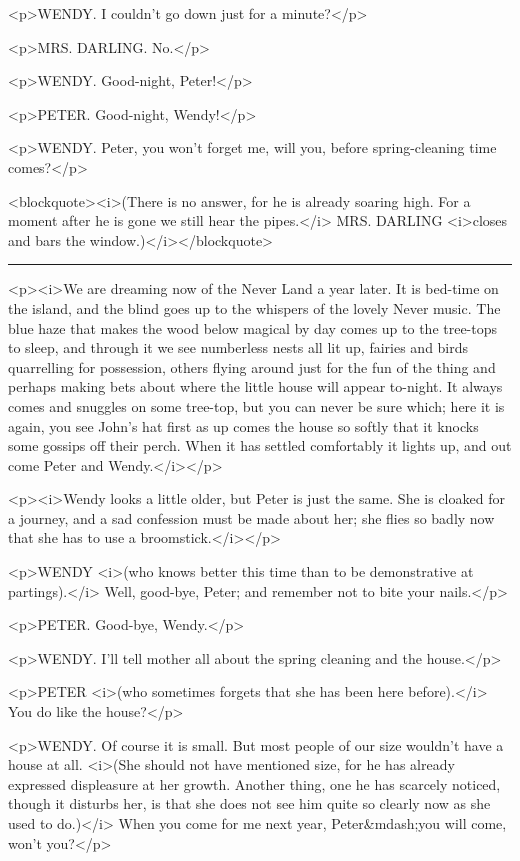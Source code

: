 <p>WENDY. I couldn't go down just for a minute?</p>

<p>MRS. DARLING. No.</p>

<p>WENDY. Good-night, Peter!</p>

<p>PETER. Good-night, Wendy!</p>

<p>WENDY. Peter, you won't forget me, will you, before
spring-cleaning time comes?</p>

<blockquote><i>(There is no answer, for he is already soaring high.
For a moment after he is gone we still hear the pipes.</i> MRS.
DARLING <i>closes and bars the window.)</i></blockquote>

\plainbreak{1}

<p><i>We are dreaming now of the Never Land a year later. It is
bed-time on the island, and the blind goes up to the whispers of the
lovely Never music. The blue haze that makes the wood below magical
by day comes up to the tree-tops to sleep, and through it we see
numberless nests all lit up, fairies and birds quarrelling for
possession, others flying around just for the fun of the thing and
perhaps making bets about where the little house will appear
to-night. It always comes and snuggles on some tree-top, but you can
never be sure which; here it is again, you see John's hat first as up
comes the house so softly that it knocks some gossips off their
perch. When it has settled comfortably it lights up, and out come
Peter and Wendy.</i></p>

<p><i>Wendy looks a little older, but Peter is just the same. She is
cloaked for a journey, and a sad confession must be made about her;
she flies so badly now that she has to use a broomstick.</i></p>

<p>WENDY <i>(who knows better this time than to be demonstrative at
partings).</i> Well, good-bye, Peter; and remember not to bite your
nails.</p>

<p>PETER. Good-bye, Wendy.</p>

<p>WENDY. I'll tell mother all about the spring cleaning and the
house.</p>

<p>PETER <i>(who sometimes forgets that she has been here
before).</i> You do like the house?</p>

<p>WENDY. Of course it is small. But most people of our size wouldn't
have a house at all. <i>(She should not have mentioned size, for he
has already expressed displeasure at her growth. Another thing, one
he has scarcely noticed, though it disturbs her, is that she does not
see him quite so clearly now as she used to do.)</i> When you come
for me next year, Peter&mdash;you will come, won't you?</p>

